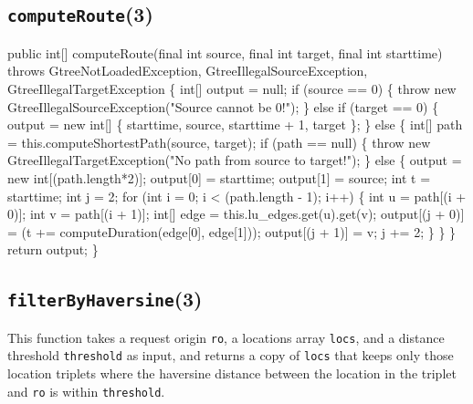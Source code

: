 \documentclass{article}
\def\nwendcode{\endtrivlist \endgroup}      %
\let\nwdocspar=\par
\begin{document}
\subsection{{\tt{}\protect{}computeRoute}(3)}
\nwenddocs{}\endmoddef{}
public int[] computeRoute(final int source, final int target, final int starttime)
throws GtreeNotLoadedException, GtreeIllegalSourceException, GtreeIllegalTargetException \{
  int[] output = null;
  if (source == 0) \{
    throw new GtreeIllegalSourceException("Source cannot be 0!");
  \} else if (target == 0) \{
    output = new int[] \{ starttime, source, starttime + 1, target \};
  \} else \{
    int[] path = this.computeShortestPath(source, target);
    if (path == null) \{
      throw new GtreeIllegalTargetException("No path from source to target!");
    \} else \{
      output = new int[(path.length*2)];
      output[0] = starttime;
      output[1] = source;
      int t = starttime;
      int j = 2;
      for (int i = 0; i < (path.length - 1); i++) \{
        int u = path[(i + 0)];
        int v = path[(i + 1)];
        int[] edge = this.lu_edges.get(u).get(v);
        output[(j + 0)] = (t += computeDuration(edge[0], edge[1]));
        output[(j + 1)] = v;
        j += 2;
      \}
    \}
  \}
  return output;
\}
\eatline
{}\nwendcode{}\nwdocspar
\subsection{{\tt{}\protect{}filterByHaversine}(3)}
This function takes a request origin {\tt{}ro}, a locations array {\tt{}locs}, and
a distance threshold {\tt{}threshold} as input, and returns a copy of {\tt{}locs}
that keeps only those location triplets where the haversine distance between
the location in the triplet and {\tt{}ro} is within {\tt{}threshold}.
\end{document}
